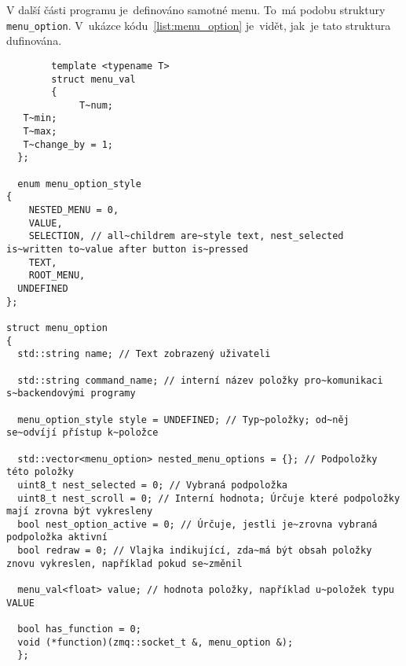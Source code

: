 V další části programu je~definováno samotné menu. To~má podobu struktury \texttt{menu_option}. V~ukázce kódu~\ref{list:menu_option} je~vidět, jak~je tato struktura dufinována.
\begin{code}
    \begin{verbatim}
        template <typename T>
        struct menu_val
        {
             T~num;
   T~min;
   T~max;
   T~change_by = 1;
  };
  
  enum menu_option_style
{
    NESTED_MENU = 0,
    VALUE,
    SELECTION, // all~childrem are~style text, nest_selected is~written to~value after button is~pressed
    TEXT,
    ROOT_MENU,
  UNDEFINED
};

struct menu_option
{
  std::string name; // Text zobrazený uživateli

  std::string command_name; // interní název položky pro~komunikaci s~backendovými programy

  menu_option_style style = UNDEFINED; // Typ~položky; od~něj se~odvíjí přístup k~položce

  std::vector<menu_option> nested_menu_options = {}; // Podpoložky této položky
  uint8_t nest_selected = 0; // Vybraná podpoložka
  uint8_t nest_scroll = 0; // Interní hodnota; Úrčuje které podpoložky mají zrovna být vykresleny
  bool nest_option_active = 0; // Úrčuje, jestli je~zrovna vybraná podpoložka aktivní
  bool redraw = 0; // Vlajka indikující, zda~má být obsah položky znovu vykreslen, například pokud se~změnil

  menu_val<float> value; // hodnota položky, například u~položek typu VALUE

  bool has_function = 0;
  void (*function)(zmq::socket_t &, menu_option &);
  };
\end{verbatim}
\end{code}

